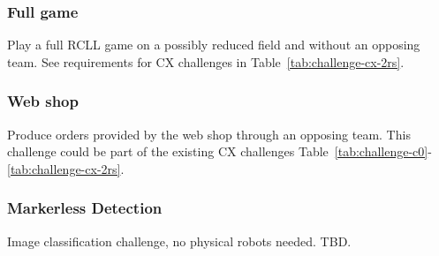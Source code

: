 \documentclass[12pt,twoside]{article}
\newcommand{\reftab}[1]{Table~\ref{#1}}
\begin{document}
\subsubsection{Full game}\label{sec:challenge-full-game}
Play a full RCLL game on a possibly reduced field and without an opposing team.
See requirements for CX challenges in \reftab{tab:challenge-cx-2rs}.

\subsubsection{Web shop}\label{sec:challenge-CX-1rs}
Produce orders provided by the web shop through an opposing team.
This challenge could be part of the existing CX challenges
\reftab{tab:challenge-c0}-\ref{tab:challenge-cx-2rs}.

\subsubsection{Markerless Detection}\label{sec:challenge-markerless}
Image classification challenge, no physical robots needed. \ac{TBD}.
\end{document}
